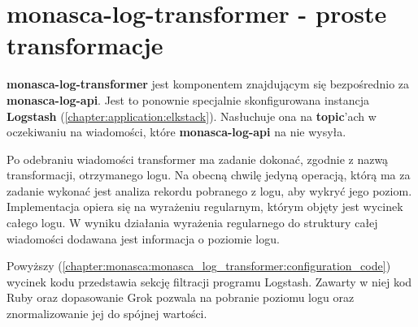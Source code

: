 \section{monasca-log-transformer - proste transformacje}
\label{chapter:monasca:monasca_log_transformer}

\textbf{monasca-log-transformer} jest komponentem znajdującym się bezpośrednio \linebreak za \textbf{monasca-log-api}. Jest to ponownie specjalnie skonfigurowana instancja
\textbf{Logstash} (\ref{chapter:application:elkstack}). Nasłuchuje ona na \textbf{topic}'ach w oczekiwaniu
na wiadomości, które \textbf{monasca-log-api} na nie wysyła. 

Po odebraniu wiadomości transformer ma zadanie dokonać, zgodnie z nazwą transformacji, otrzymanego 
logu. Na obecną chwilę jedyną operacją, którą ma za zadanie wykonać jest analiza rekordu pobranego z logu,
aby wykryć jego poziom. Implementacja opiera się na wyrażeniu regularnym, którym objęty jest wycinek
całego logu. W wyniku działania wyrażenia regularnego do struktury całej wiadomości dodawana jest informacja
o poziomie logu. 


Powyższy (\ref{chapter:monasca:monasca_log_transformer:configuration_code}) wycinek kodu przedstawia
sekcję filtracji programu Logstash. Zawarty w niej kod Ruby oraz dopasowanie Grok pozwala na 
pobranie poziomu logu oraz znormalizowanie jej do spójnej wartości. 